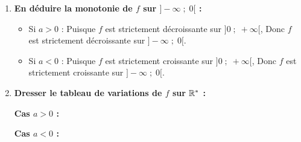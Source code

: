 \documentclass[10pt, a4paper]{article}
\begin{document}
\begin{Solution}[ACTIVITÉ][5]
\begin{enumerate}[leftmargin=*,itemsep=0.5pt]
\begin{itemize}[leftmargin=*,itemsep=0.5pt]
    D'où : La fonction $f$ est strictement décroissante sur $\big]0 \;;\; +\infty\big[$.

    \item \textbf{Deuxième cas : $a < 0$}
    On a :
    \[ \begin{cases} 
        a < 0 \\ 
        xy > 0 
    \end{cases} \quad \text{alors} \quad -\frac{a}{xy} > 0 \]
    Donc : \quad $T(x;y) > 0$
    
    D'où : La fonction $f$ est strictement croissante sur $\big]0 \;;\; +\infty\big[$.
\end{itemize}

\item \textbf{En déduire la monotonie de $f$ sur $\big]-\infty \;;\; 0\big[$ :}
\begin{itemize}[leftmargin=*,itemsep=0.5pt]
    \item Si $a > 0$ : Puisque $f$ est strictement décroissante sur $\big]0 \;;\; +\infty\big[$, 
    Donc $f$ est strictement décroissante sur $\big]-\infty \;;\; 0\big[$.
    
    \item Si $a < 0$ : Puisque $f$ est strictement croissante sur $\big]0 \;;\; +\infty\big[$,
    Donc $f$ est strictement croissante sur $\big]-\infty \;;\; 0\big[$.
\end{itemize}

\item \textbf{Dresser le tableau de variations de $f$ sur $\mathbb{R}^*$ :}

\begin{minipage}{0.48\linewidth}
    \textbf{Cas $a > 0$ :} \\[5pt]
\end{minipage}
\hfill
\begin{minipage}{0.48\linewidth}
    \textbf{Cas $a < 0$ :} \\[5pt]
\end{minipage}


\end{enumerate}
\end{Solution}
\end{document}

